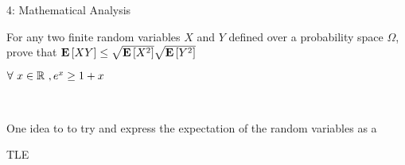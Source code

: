 \documentclass[12pt]{article}
\begin{document}
\begin{problem}{4: Mathematical Analysis}\
\begin{subprob}
    \item For any two finite random variables $X$ and $Y$ defined over a probability space $\Omega$, prove that $\mathbf{E}\left[XY\right] \leq \sqrt{\mathbf{E}\left[X^2\right]}\sqrt{\mathbf{E}\left[Y^2\right]}$
    \item $\forall~x\in \mathbb{R}~, e^x \geq 1 + x$
\end{subprob}
\end{problem}

\begin{solution}\
\begin{subprob} 
    \item One idea to to try and express the expectation of the random variables as a 
    \item TLE
\end{subprob}
\end{solution}

\clearpage
\end{document}

